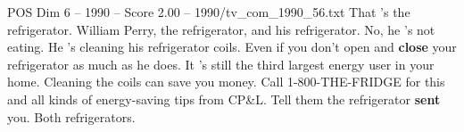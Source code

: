 \begin{textsample}{POS Dim 6 – 1990 – Score 2.00 – 1990/tv\_com\_1990\_56.txt}  \label{ex:f6_pos_071}
That 's the refrigerator.
William Perry, the refrigerator, and his refrigerator.
No, he 's not eating.
He 's cleaning his refrigerator coils.
Even if you don't open and \textbf{close} your refrigerator as much as he does.
It 's still the third largest energy user in your home.
Cleaning the coils can save you money.
Call 1-800-THE-FRIDGE for this and all kinds of energy-saving tips from CP\&L.
Tell them the refrigerator \textbf{sent} you.
Both refrigerators.

\end{textsample}
